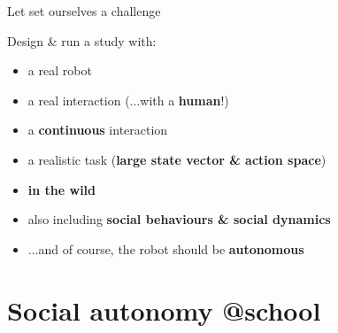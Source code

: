 \documentclass[xcolor=table]{beamer}
\begin{document}
\begin{frame}{Let set ourselves a challenge}

\begin{exampleblock}{Design \& run a study with:}
    
    \begin{itemize}
        \item<+-> a real robot
        \item<+-> a real interaction (...with a \textbf{human}!)
        \item<+-> a \textbf{continuous} interaction
        \item<+-> a realistic task (\textbf{large state vector \& action space})
        \item<+-> \textbf{in the wild}
        \item<+-> also including \textbf{social behaviours \& social dynamics}
        \item<+-> ...and of course, the robot should be \textbf{autonomous}
    \end{itemize}
\end{exampleblock}

\end{frame}

\section*{Social autonomy @school}

\end{document}
